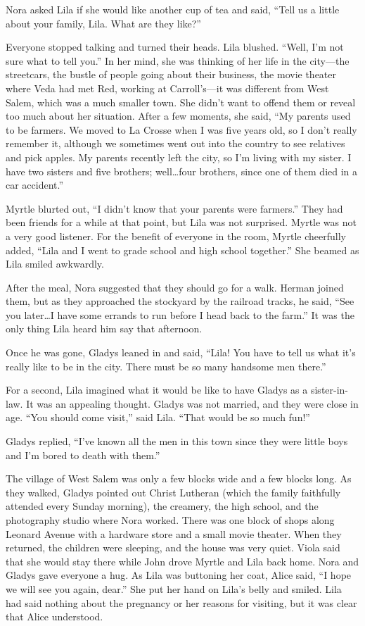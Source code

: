 \documentclass[
  letterpaper,
]{book}
\begin{document}
Nora asked Lila if she would like another cup of tea and said, ``Tell us
a little about your family, Lila. What are they like?''

Everyone stopped talking and turned their heads. Lila blushed. ``Well,
I'm not sure what to tell you.'' In her mind, she was thinking of her
life in the city---the streetcars, the bustle of people going about
their business, the movie theater where Veda had met Red, working at
Carroll's---it was different from West Salem, which was a much smaller
town. She didn't want to offend them or reveal too much about her
situation. After a few moments, she said, ``My parents used to be
farmers. We moved to La Crosse when I was five years old, so I don't
really remember it, although we sometimes went out into the country to
see relatives and pick apples. My parents recently left the city, so I'm
living with my sister. I have two sisters and five brothers;
well\ldots four brothers, since one of them died in a car accident.''

Myrtle blurted out, ``I didn't know that your parents were farmers.''
They had been friends for a while at that point, but Lila was not
surprised. Myrtle was not a very good listener. For the benefit of
everyone in the room, Myrtle cheerfully added, ``Lila and I went to
grade school and high school together.'' She beamed as Lila smiled
awkwardly.

After the meal, Nora suggested that they should go for a walk. Herman
joined them, but as they approached the stockyard by the railroad
tracks, he said, ``See you later\ldots I have some errands to run before
I head back to the farm.'' It was the only thing Lila heard him say that
afternoon.

Once he was gone, Gladys leaned in and said, ``Lila! You have to tell us
what it's really like to be in the city. There must be so many handsome
men there.''

For a second, Lila imagined what it would be like to have Gladys as a
sister-in-law. It was an appealing thought. Gladys was not married, and
they were close in age. ``You should come visit,'' said Lila. ``That
would be so much fun!''

Gladys replied, ``I've known all the men in this town since they were
little boys and I'm bored to death with them.''

The village of West Salem was only a few blocks wide and a few blocks
long. As they walked, Gladys pointed out Christ Lutheran (which the
family faithfully attended every Sunday morning), the creamery, the high
school, and the photography studio where Nora worked. There was one
block of shops along Leonard Avenue with a hardware store and a small
movie theater. When they returned, the children were sleeping, and the
house was very quiet. Viola said that she would stay there while John
drove Myrtle and Lila back home. Nora and Gladys gave everyone a hug. As
Lila was buttoning her coat, Alice said, ``I hope we will see you again,
dear.'' She put her hand on Lila's belly and smiled. Lila had said
nothing about the pregnancy or her reasons for visiting, but it was
clear that Alice understood.
\end{document}
